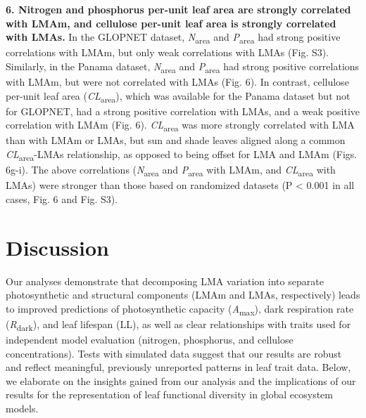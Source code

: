 \documentclass[12pt,]{article}
\theoremstyle{definition}
\theoremstyle{definition}
\theoremstyle{definition}
\theoremstyle{remark}
\begin{document}
\textbf{6. Nitrogen and phosphorus per-unit leaf area are strongly
correlated with LMAm, and cellulose per-unit leaf area is strongly
correlated with LMAs.} In the GLOPNET dataset,
\emph{N}\textsubscript{area} and \emph{P}\textsubscript{area} had strong
positive correlations with LMAm, but only weak correlations with LMAs
(Fig. S3). Similarly, in the Panama dataset,
\emph{N}\textsubscript{area} and \emph{P}\textsubscript{area} had strong
positive correlations with LMAm, but were not correlated with LMAs (Fig.
6). In contrast, cellulose per-unit leaf area
(\emph{CL}\textsubscript{area}), which was available for the Panama
dataset but not for GLOPNET, had a strong positive correlation with
LMAs, and a weak positive correlation with LMAm (Fig. 6).
\emph{CL}\textsubscript{area} was more strongly correlated with LMA than
with LMAm or LMAs, but sun and shade leaves aligned along a common
\emph{CL}\textsubscript{area}-LMAs relationship, as opposed to being
offset for LMA and LMAm (Figs. 6g-i). The above correlations
(\emph{N}\textsubscript{area} and \emph{P}\textsubscript{area} with
LMAm, and \emph{CL}\textsubscript{area} with LMAs) were stronger than
those based on randomized datasets (P \textless{} 0.001 in all cases,
Fig. 6 and Fig. S3).

\hypertarget{discussion}{%
\section{Discussion}\label{discussion}}

Our analyses demonstrate that decomposing LMA variation into separate
photosynthetic and structural components (LMAm and LMAs, respectively)
leads to improved predictions of photosynthetic capacity
(\emph{A}\textsubscript{max}), dark respiration rate
(\emph{R}\textsubscript{dark}), and leaf lifespan (LL), as well as clear
relationships with traits used for independent model evaluation
(nitrogen, phosphorus, and cellulose concentrations). Tests with
simulated data suggest that our results are robust and reflect
meaningful, previously unreported patterns in leaf trait data. Below, we
elaborate on the insights gained from our analysis and the implications
of our results for the representation of leaf functional diversity in
global ecosystem models.
\end{document}
